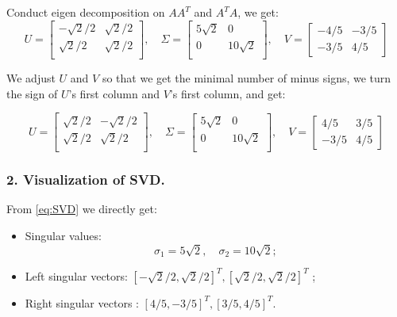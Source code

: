 Conduct eigen decomposition on $AA^T$ and $A^TA$, we get:
\begin{equation*}
    U  = 
    \begin{bmatrix}
        -\sqrt{2}/2 & \sqrt{2}/2\\
        \sqrt{2}/2 & \sqrt{2}/2\\
    \end{bmatrix}, \quad
    \Sigma = 
    \begin{bmatrix}
        5\sqrt{2} & 0\\
        0 & 10\sqrt{2}\\
    \end{bmatrix}, \quad
    V = 
    \begin{bmatrix}
        -4/5 & -3/5\\
        -3/5 & 4/5 
    \end{bmatrix}
\end{equation*}

We adjust $U$ and $V$ so that we get
the minimal number of minus signs,
we turn the sign of $U$'s first column and 
$V$'s first column, and get:

\begin{equation}
    \label{eq:SVD}
    U  = 
    \begin{bmatrix}
        \sqrt{2}/2 & -\sqrt{2}/2\\
        \sqrt{2}/2 & \sqrt{2}/2\\
    \end{bmatrix}, \quad
    \Sigma = 
    \begin{bmatrix}
        5\sqrt{2} & 0\\
        0 & 10\sqrt{2}\\
    \end{bmatrix}, \quad
    V = 
    \begin{bmatrix}
        4/5 & 3/5\\
        -3/5 & 4/5 
    \end{bmatrix}
\end{equation}




\subsubsection*{2. Visualization of SVD.}
From \eqref{eq:SVD} we directly get:
\begin{itemize}
    \item Singular values:
    \begin{equation}
        \label{eq:sigma}
        \sigma_1 = 5\sqrt{2},\quad \sigma_2 = 10\sqrt{2};
    \end{equation}
    \item Left singular vectors:  $[-\sqrt{2}/2, \sqrt{2}/2]^T, [\sqrt{2}/2, \sqrt{2}/2]^T$ ;
    \item Right singular vectors : $[4/5, -3/5]^T, [3/5, 4/5]^T$.
\end{itemize}

